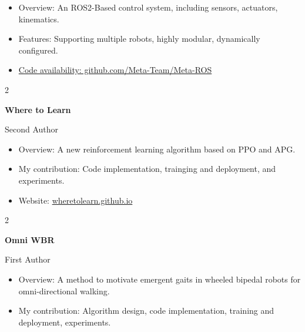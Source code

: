 \documentclass[10pt, letterpaper]{article}
\newenvironment{highlights}{
    \begin{itemize}[
        topsep=0.10 cm,
        parsep=0.10 cm,
        partopsep=0pt,
        itemsep=0pt,
        leftmargin=0 cm + 10pt
    ]
}{
    \end{itemize}
} %
\newenvironment{twocolentry}[2][]{
    \onecolentry
    \def\secondColumn{#2}
    \setcolumnwidth{\fill, 4.5 cm}
    \begin{paracol}{2}
}{
    \switchcolumn \raggedleft \secondColumn
    \end{paracol}
    \endonecolentry
} %
\begin{document}
        \vspace{0.10 cm}
        \begin{highlights}
            \item Overview: An ROS2-Based control system, including sensors, actuators, kinematics.
            \item Features: Supporting multiple robots, highly modular, dynamically configured.
            \item \href{https://github.com/Meta-Team/Meta-ROS}{Code availability: github.com/Meta-Team/Meta-ROS}
        \end{highlights}

        \vspace{0.2 cm}
    
        \begin{twocolentry}{
            Second Author
        }
            \textbf{Where to Learn}

        \end{twocolentry}

        \vspace{0.10 cm}
        \begin{highlights}
            \item Overview: A new reinforcement learning algorithm based on PPO and APG.
            \item My contribution: Code implementation, trainging and deployment, and experiments.
            \item Website: \href{https://wheretolearn.github.io/}{wheretolearn.github.io}
        \end{highlights}

        \vspace{0.2 cm}

        \begin{twocolentry}{
            First Author
        }
            \textbf{Omni WBR}
        \end{twocolentry}

        \vspace{0.10 cm}
        \begin{highlights}
            \item Overview: A method to motivate emergent gaits in wheeled bipedal robots for omni-directional walking.
            \item My contribution: Algorithm design, code implementation, training and deployment, experiments.
        \end{highlights}
\end{document}
